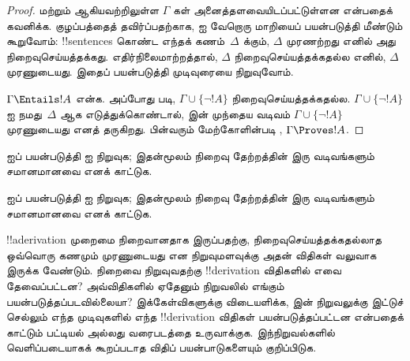 \documentclass[../../../include/open-logic-section]{subfiles}
\begin{document}
\begin{proof}
 மற்றும்  ஆகியவற்றிலுள்ள
$\Gamma$ கள் அனைத்தளவையிடப்பட்டுள்ளன என்பதைக் கவனிக்க. குழப்பத்தைத்
தவிர்ப்பதற்காக,  ஐ வேறொரு மாறியைப் பயன்படுத்தி
மீண்டும் கூறுவோம்: !!{sentence}s கொண்ட எந்தக் கணம்~$\Delta$ க்கும்,
$\Delta$ முரணற்றது எனில் அது நிறைவுசெய்யத்தக்கது. எதிர்நிலைமாற்றத்தால்,
$\Delta$ நிறைவுசெய்யத்தக்கதல்ல எனில், $\Delta$ முரணுடையது. இதைப் பயன்படுத்தி
முடிவுரையை நிறுவுவோம்.

$\Gamma \Entails !A$ என்க. அப்போது 
படி, $\Gamma \cup \{\lnot !A\}$ நிறைவுசெய்யத்தக்கதல்ல. $\Gamma \cup
\{\lnot !A\}$ ஐ நமது~$\Delta$ ஆக எடுத்துக்கொண்டால்,
 இன் முந்தைய வடிவம் $\Gamma \cup \{\lnot !A\}$
முரணுடையது எனத் தருகிறது. பின்வரும் மேற்கோளின்படி
,
$\Gamma \Proves !A$.
\end{proof}

\begin{prob}
 ஐப் பயன்படுத்தி
 ஐ நிறுவுக; இதன்மூலம் நிறைவு
தேற்றத்தின் இரு வடிவங்களும் சமானமானவை எனக் காட்டுக.
\end{prob}
\tagendprob

\begin{prob}
 ஐப் பயன்படுத்தி
 ஐ நிறுவுக; இதன்மூலம் நிறைவு
தேற்றத்தின் இரு வடிவங்களும் சமானமானவை எனக் காட்டுக.
\end{prob}
\tagendprob

\begin{prob}
!!a{derivation} முறைமை நிறைவானதாக இருப்பதற்கு, நிறைவுசெய்யத்தக்கதல்லாத
ஒவ்வொரு கணமும் முரணுடையது என நிறுவுமளவுக்கு அதன் விதிகள் வலுவாக இருக்க
வேண்டும். நிறைவை நிறுவுவதற்கு !!{derivation} விதிகளில் எவை தேவைப்பட்டன?
அவ்விதிகளில் ஏதேனும் நிறுவலில் எங்கும் பயன்படுத்தப்படவில்லையா? இக்கேள்விகளுக்கு
விடையளிக்க,  இன் நிறுவலுக்கு இட்டுச்
செல்லும் எந்த முடிவுகளில் எந்த !!{derivation} விதிகள் பயன்படுத்தப்பட்டன
என்பதைக் காட்டும் பட்டியல் அல்லது வரைபடத்தை உருவாக்குக. இந்நிறுவல்களில்
வெளிப்படையாகக் கூறப்படாத விதிப் பயன்பாடுகளையும் குறிப்பிடுக.
\end{prob}
\tagendprob
\end{document}
